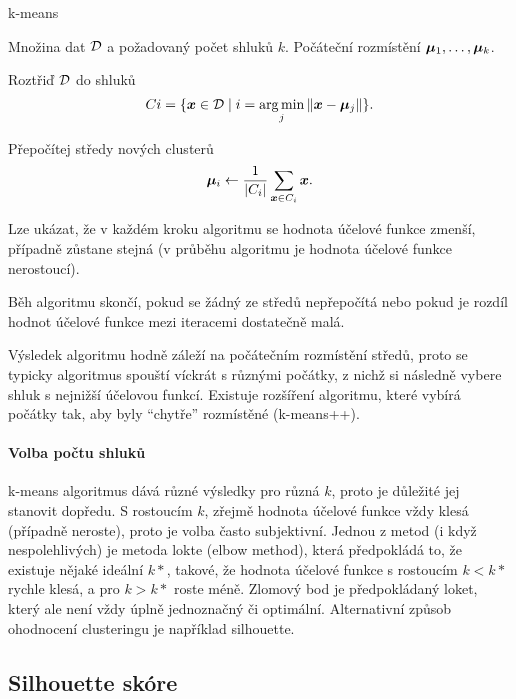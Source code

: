\documentclass[../main.tex]{subfiles}
\begin{document}
\begin{algorithm}[H]
    \renewcommand{\thealgorithm}{}
    \caption{k-means}
    \begin{algorithmic}[1]
        \Require
        \Statex Množina dat $\mathcal{D}$ a požadovaný počet shluků $k$.
        \Statex Počáteční rozmístění $\bm{\mu}_1, \ldots, \bm{\mu}_k$.
        \Statex

        \State Roztřiď $\mathcal{D}$ do shluků
        \[
            Ci = \{ \bm{x} \in \mathcal{D} \mid i = \operatorname*{arg\,min}_j \| \bm{x} - \bm{\mu}_j \| \}.
        \]

        \State Přepočítej středy nových clusterů
        \[
            \bm{\mu}_i \leftarrow \frac{1}{|C_i|} \sum_{\bm{x} \in C_i} \bm{x}.
        \]
        \EndWhile
    \end{algorithmic}
\end{algorithm}

Lze ukázat, že v každém kroku algoritmu se hodnota účelové funkce zmenší, případně zůstane stejná (v průběhu algoritmu je hodnota účelové funkce nerostoucí).

Běh algoritmu skončí, pokud se žádný ze středů nepřepočítá nebo pokud je rozdíl hodnot účelové funkce mezi iteracemi dostatečně malá.

Výsledek algoritmu hodně záleží na počátečním rozmístění středů, proto se typicky algoritmus spouští víckrát s různými počátky, z nichž si následně vybere shluk s nejnižší účelovou funkcí. Existuje rozšíření algoritmu, které vybírá počátky tak, aby byly ``chytře'' rozmístěné (k-means++).

\paragraph{Volba počtu shluků}

k-means algoritmus dává různé výsledky pro různá $k$, proto je důležité jej stanovit dopředu. S rostoucím $k$, zřejmě hodnota účelové funkce vždy klesá (případně neroste), proto je volba často subjektivní. Jednou z metod (i když nespolehlivých) je metoda lokte (elbow method), která předpokládá to, že existuje nějaké ideální $k*$, takové, že hodnota účelové funkce s rostoucím $k < k*$ rychle klesá, a pro $k > k*$ roste méně. Zlomový bod je předpokládaný loket, který ale není vždy úplně jednoznačný či optimální. Alternativní způsob ohodnocení clusteringu je například silhouette.

\subsection{Silhouette skóre}
\end{document}
